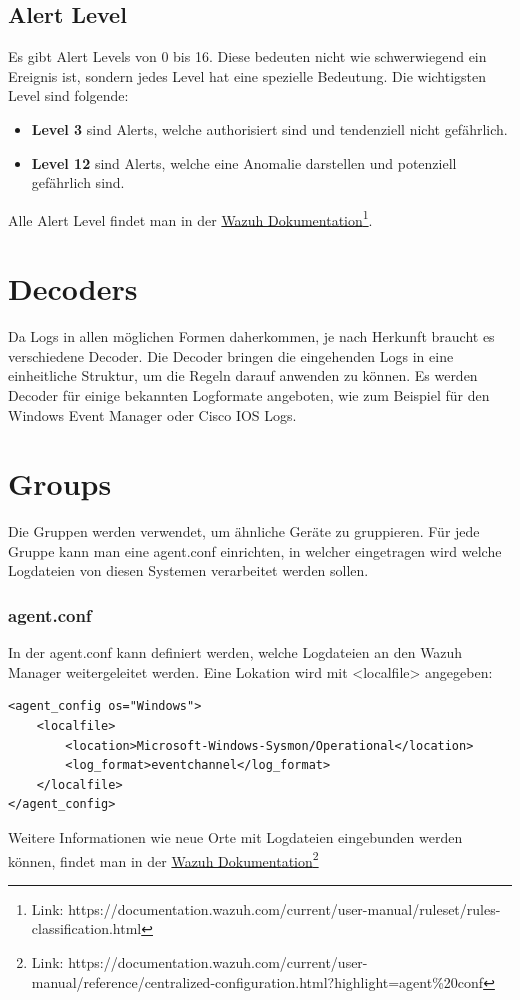 \subsection{Alert Level}
Es gibt Alert Levels von 0 bis 16. 
Diese bedeuten nicht wie schwerwiegend ein Ereignis ist, sondern jedes Level hat eine spezielle Bedeutung.
Die wichtigsten Level sind folgende:
\begin{itemize}
    \item \textbf{Level 3} sind Alerts, welche authorisiert sind und tendenziell nicht gefährlich.
    \item \textbf{Level 12} sind Alerts, welche eine Anomalie darstellen und potenziell gefährlich sind.
\end{itemize}

Alle Alert Level findet man in der \href{https://documentation.wazuh.com/current/user-manual/ruleset/rules-classification.html}{Wazuh Dokumentation}\footnote{Link: https://documentation.wazuh.com/current/user-manual/ruleset/rules-classification.html}.

\section{Decoders}
Da Logs in allen möglichen Formen daherkommen, je nach Herkunft braucht es verschiedene Decoder.
Die Decoder bringen die eingehenden Logs in eine einheitliche Struktur, um die Regeln darauf anwenden zu können.
Es werden Decoder für einige bekannten Logformate angeboten, wie zum Beispiel für den Windows Event Manager oder Cisco IOS Logs.


\section{Groups}
Die Gruppen werden verwendet, um ähnliche Geräte zu gruppieren.
Für jede Gruppe kann man eine agent.conf einrichten, in welcher eingetragen wird welche Logdateien von diesen Systemen verarbeitet werden sollen. 

\subsubsection{agent.conf}
In der agent.conf kann definiert werden, welche Logdateien an den Wazuh Manager weitergeleitet werden. 
Eine Lokation wird mit <localfile> angegeben:
\begin{lstlisting}
<agent_config os="Windows">
    <localfile>
        <location>Microsoft-Windows-Sysmon/Operational</location>
        <log_format>eventchannel</log_format>
    </localfile>
</agent_config>
\end{lstlisting}
Weitere Informationen wie neue Orte mit Logdateien eingebunden werden können, findet man in der \href{https://documentation.wazuh.com/current/user-manual/reference/centralized-configuration.html?highlight=agent%20conf}{Wazuh Dokumentation}\footnote{Link: https://documentation.wazuh.com/current/user-manual/reference/centralized-configuration.html?highlight=agent\%20conf}